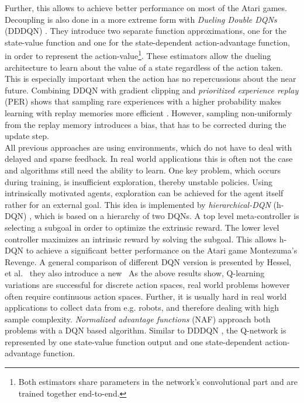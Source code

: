	Further, this allows to achieve better performance on most of the Atari games. 
	Decoupling is also done in a more extreme form with \textit{Dueling Double DQNs} (DDDQN) \cite{Wang2016}. 
	They introduce two separate function approximations, one for the state-value function and one for the state-dependent action-advantage function, in order to represent the action-value\footnote{Both estimators share parameters in the network's convolutional part and are trained together end-to-end.}.
	These estimators allow the dueling architecture to learn about the value of a state regardless of the action taken. 
	This is especially important when the action has no repercussions about the near future. 
	Combining DDQN with gradient clipping and \textit{prioritized experience replay} (PER) \cite{Schaul2015} shows that sampling rare experiences with a higher probability makes learning with replay memories more efficient \cite{Lin1992}. 
	However, sampling non-uniformly from the replay memory introduces a bias, that has to be corrected during the update step.\\
	All previous approaches are using environments, which do not have to deal with delayed and sparse feedback.
	In real world applications this is often not the case and algorithms still need the ability to learn.
	One key problem, which occurs during training, is insufficient exploration, thereby unstable policies. 
	Using intrinsically motivated agents, exploration can be achieved for the agent itself rather for an external goal. 
	This idea is implemented by \textit{hierarchical-DQN} (h-DQN) \cite{Kulkarni2016}, which is based on a hierarchy of two DQNs.
	A top level meta-controller is selecting a subgoal in order to optimize the extrinsic reward.
	The lower level controller maximizes an intrinsic reward by solving the subgoal.
	This allows h-DQN to achieve a significant better performance on the Atari game Montezuma's Revenge.
	A general comparison of different DQN version is presented by Hessel, et al. \cite{Hessel2018}\, they also introduce a new \
	As the above results show, Q-learning variations are successful for discrete action spaces, real world problems however often require continuous action spaces.
	Further, it is usually hard in real world applications to collect data from e.g. robots, and therefore dealing with high sample complexity.
	\textit{Normalized advantage functions} (NAF) \cite{Gu2016} approach both problems with a DQN based algorithm.
	Similar to DDDQN \cite{Wang2016}, the Q-network is represented by one state-value function output and one state-dependent action-advantage function.
